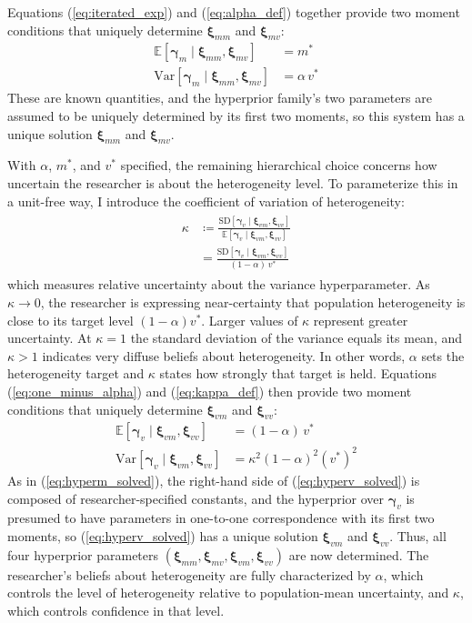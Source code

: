 \documentclass[12pt,a4paper]{article}
\theoremstyle{definition}
\theoremstyle{remark}
\newcommand{\E}[1]{\mathbb{E}\left[#1\right]}
\newcommand{\Var}[1]{\text{Var}\left[#1\right]}
\newcommand{\hypem}{\boldsymbol{\gamma}_m}
\newcommand{\hypev}{\boldsymbol{\gamma}_v}
\newcommand{\dpm}{m^*}
\newcommand{\dpv}{v^*}
\newcommand{\hpriormm}{\boldsymbol{\xi}_{mm}}
\newcommand{\hpriormv}{\boldsymbol{\xi}_{mv}}
\newcommand{\hpriorvm}{\boldsymbol{\xi}_{vm}}
\newcommand{\hpriorvv}{\boldsymbol{\xi}_{vv}}
\newcommand{\Ehpm}[1]{\E{#1 \mid \hpriormm, \hpriormv}}
\newcommand{\Varhpm}[1]{\Var{#1 \mid \hpriormm, \hpriormv}}
\newcommand{\Ehpv}[1]{\E{#1 \mid \hpriorvm, \hpriorvv}}
\newcommand{\Varhpv}[1]{\Var{#1 \mid \hpriorvm, \hpriorvv}}
\newcommand{\SDhpv}[1]{\text{SD}\!\left[#1 \mid \hpriorvm, \hpriorvv\right]}
\begin{document}
Equations (\ref{eq:iterated_exp}) and (\ref{eq:alpha_def}) together provide two
moment conditions that uniquely determine $\hpriormm{}$ and $\hpriormv{}$:
\begin{align}
\label{eq:hyperm_solved}
\Ehpm{\hypem{}} &= m^* \\
\Varhpm{\hypem{}} &= \alpha \, v^*
\end{align}
\noindent These are known quantities, and the hyperprior family's two
parameters are assumed to be uniquely determined by its first two moments,
so this system has a unique solution
$\hpriormm{}$ and $\hpriormv{}$.

With $\alpha$, $\dpm$, and $\dpv$ specified, the remaining hierarchical choice
concerns how uncertain the researcher is about the heterogeneity level. To
parameterize this in a unit-free way, I introduce the coefficient of variation
of heterogeneity:
\begin{align}
  \label{eq:kappa_def}
  \begin{split}
    \kappa &\coloneqq \frac{\SDhpv{\hypev{}}}{\Ehpv{\hypev{}}} \\[.75em]
    {} &= \frac{\SDhpv{\hypev{}}}{(1 - \alpha) \, v^*}
  \end{split}
\end{align}
which measures relative uncertainty about the variance hyperparameter. As
$\kappa \to 0$, the researcher is expressing near-certainty that population
heterogeneity is close to its target level $(1-\alpha)v^*$. Larger values of
$\kappa$ represent greater uncertainty. At $\kappa = 1$ the standard deviation
of the variance equals its mean, and $\kappa > 1$ indicates very diffuse
beliefs about heterogeneity. In other words, $\alpha$ sets the heterogeneity
target and $\kappa$ states how strongly that target is held. Equations
(\ref{eq:one_minus_alpha}) and
(\ref{eq:kappa_def}) then provide two moment conditions that uniquely
determine $\hpriorvm{}$ and $\hpriorvv{}$:
\begin{align}
\label{eq:hyperv_solved}
\Ehpv{\hypev{}} &= (1 - \alpha) \, v^* \\
\Varhpv{\hypev{}} &= \kappa^2 (1 - \alpha)^2 (v^*)^2
\end{align}
\noindent As in (\ref{eq:hyperm_solved}), the right-hand side of
(\ref{eq:hyperv_solved}) is composed of researcher-specified constants, and
the hyperprior over $\hypev$ is presumed to have parameters in one-to-one
correspondence with its first two moments, so (\ref{eq:hyperv_solved}) has a
unique solution $\hpriorvm{}$ and $\hpriorvv{}$.
Thus, all four hyperprior parameters $(\hpriormm{}, \hpriormv{}, \hpriorvm{},
\hpriorvv{})$ are now determined. The researcher's beliefs about heterogeneity
are fully characterized by $\alpha$, which controls the level of heterogeneity
relative to population-mean uncertainty, and $\kappa$, which controls
confidence in that level.
\end{document}

